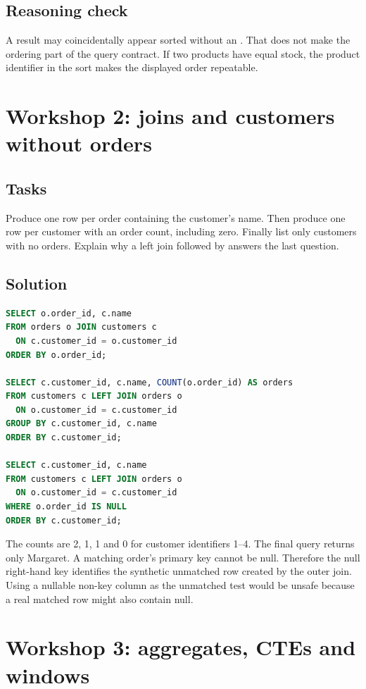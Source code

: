 \subsection{Reasoning check}
A result may coincidentally appear sorted without an .
That does not make the ordering part of the query contract. If two products
have equal stock, the product identifier in the sort makes the displayed
order repeatable.

\section{Workshop 2: joins and customers without orders}
\subsection{Tasks}
Produce one row per order containing the customer's name. Then produce one
row per customer with an order count, including zero. Finally list only
customers with no orders. Explain why a left join followed by
 answers the last question.

\subsection{Solution}
\begin{lstlisting}[language=SQL]
SELECT o.order_id, c.name
FROM orders o JOIN customers c
  ON c.customer_id = o.customer_id
ORDER BY o.order_id;

SELECT c.customer_id, c.name, COUNT(o.order_id) AS orders
FROM customers c LEFT JOIN orders o
  ON o.customer_id = c.customer_id
GROUP BY c.customer_id, c.name
ORDER BY c.customer_id;

SELECT c.customer_id, c.name
FROM customers c LEFT JOIN orders o
  ON o.customer_id = c.customer_id
WHERE o.order_id IS NULL
ORDER BY c.customer_id;
\end{lstlisting}
The counts are 2, 1, 1 and 0 for customer identifiers 1--4. The final query
returns only Margaret. A matching order's primary key cannot be null.
Therefore the null right-hand key identifies the synthetic unmatched row
created by the outer join. Using a nullable non-key column as the unmatched
test would be unsafe because a real matched row might also contain null.

\section{Workshop 3: aggregates, CTEs and windows}
